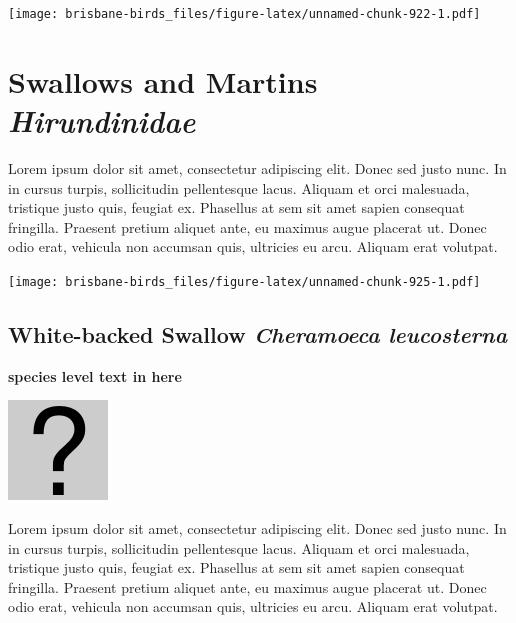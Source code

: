\documentclass[]{book}
\let\origfigure\figure
\let\endorigfigure\endfigure
\renewenvironment{figure}[1][2] {
  \expandafter\origfigure\expandafter[H]
} {
  \endorigfigure
}
\begin{document}
\begin{figure}
\centering
\texttt{[image: brisbane-birds\_files/figure-latex/unnamed-chunk-922-1.pdf]}
\caption{\label{fig:unnamed-chunk-922}insert figure caption}
\end{figure}

\chapter{\texorpdfstring{Swallows and Martins
\emph{Hirundinidae}}{Swallows and Martins Hirundinidae}}\label{swallows-and-martins-hirundinidae}

Lorem ipsum dolor sit amet, consectetur adipiscing elit. Donec sed justo
nunc. In in cursus turpis, sollicitudin pellentesque lacus. Aliquam et
orci malesuada, tristique justo quis, feugiat ex. Phasellus at sem sit
amet sapien consequat fringilla. Praesent pretium aliquet ante, eu
maximus augue placerat ut. Donec odio erat, vehicula non accumsan quis,
ultricies eu arcu. Aliquam erat volutpat.

\texttt{[image: brisbane-birds\_files/figure-latex/unnamed-chunk-925-1.pdf]}

\section{\texorpdfstring{White-backed Swallow \emph{Cheramoeca
leucosterna}}{White-backed Swallow Cheramoeca leucosterna}}\label{white-backed-swallow-cheramoeca-leucosterna}

\textbf{species level text in here}

\begin{figure}
\centering
\includegraphics{assets/missing.png}
\caption{No image for species}
\end{figure}

Lorem ipsum dolor sit amet, consectetur adipiscing elit. Donec sed justo
nunc. In in cursus turpis, sollicitudin pellentesque lacus. Aliquam et
orci malesuada, tristique justo quis, feugiat ex. Phasellus at sem sit
amet sapien consequat fringilla. Praesent pretium aliquet ante, eu
maximus augue placerat ut. Donec odio erat, vehicula non accumsan quis,
ultricies eu arcu. Aliquam erat volutpat.
\end{document}
